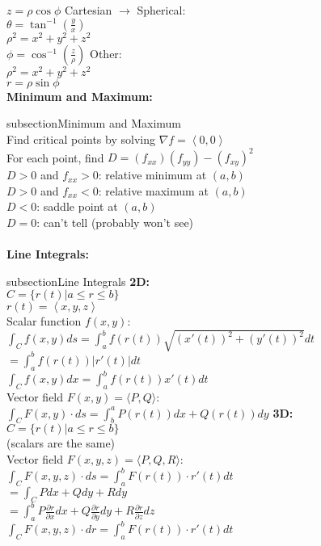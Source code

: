 \documentclass{article}
\newcommand{\upspace}{\vspace{0px}}
\newcommand{\zzz}[1]{\0 {\textbf{#1:}} \addcontentsline{toc} {subsection}{#1}}
\newcommand{\aaa}{\upspace \1}
\newcommand{\ang}[1]{\left\langle #1 \right\rangle}
\newcommand{\prt}[2]{\frac{\partial#1}{\partial#2}}
\newcommand{\grad}{\nabla}
\begin{document}
\begin{multicols*}{2}
\begin{outline}[compactitem]
	\\ $z = \rho\cos\phi$
	\aaa Cartesian $\rightarrow$ Spherical:
	\\ $\theta = \tan^{-1}\left(\frac{y}{x}\right)$
	\\ $\rho^2 = x^2 + y^2 + z^2$
	\\ $\phi = \cos^{-1}\left(\frac{z}{\rho}\right)$
	\aaa Other:
	\\ $\rho^2 = x^2 + y^2 + z^2$
	\\ $r = \rho \sin\phi$
\\
\zzz{Minimum and Maximum}
\\ Find critical points by solving $\grad f = \ang{0,0}$
\\ For each point, find $D = (f_{xx})(f_{yy}) - \left(f_{xy}\right)^2$
\\ $D>0$ and $f_{xx}>0$: relative minimum at $(a,b)$
\\ $D>0$ and $f_{xx}<0$: relative maximum at $(a,b)$
\\ $D<0$: saddle point at $(a,b)$
\\ $D=0$: can't tell (probably won't see)
\\
\\
\zzz{Line Integrals}
	\aaa\textbf{2D:}
	\\ $C = \{r(t) | a \leq r \leq b\}$
	\\ $r(t) = \ang{x,y,z}$
	\\ Scalar function $f(x,y)$:
	\\ $\int_C f(x,y) ds = \int_a^b f(r(t)) \sqrt{(x'(t))^2 + (y'(t))^2} dt$
	\\ $= \int_a^b f(r(t))|r'(t)| dt$
	\\ $\int_C f(x,y)dx = \int_a^b f(r(t))x'(t)dt$
	\\ Vector field $F(x,y) = \langle P, Q \rangle$:
	\\ $\int_C F(x,y) \cdot ds = \int_b^a P(r(t)) dx + Q(r(t)) dy $
	\aaa\textbf{3D:}
	\\ $C = \{r(t) | a \leq r \leq b\}$
	\\ (scalars are the same)
	\\ Vector field $F(x,y,z) = \langle P, Q, R \rangle$:
	\\ $\int_C F(x,y,z) \cdot ds  = \int_a^b F(r(t))\cdot r'(t) dt$
	\\ $= \int_C P dx + Q dy + R dy $
	\\ $= \int_a^b P\prt{r}{x} dx + Q\prt{r}{y} dy + R\prt{r}{z} dz $
	\\ $\int_C F(x,y,z) \cdot dr = \int_a^b F(r(t)) \cdot r'(t) dt $
\\

\end{outline}
\end{multicols*}
\end{document}
